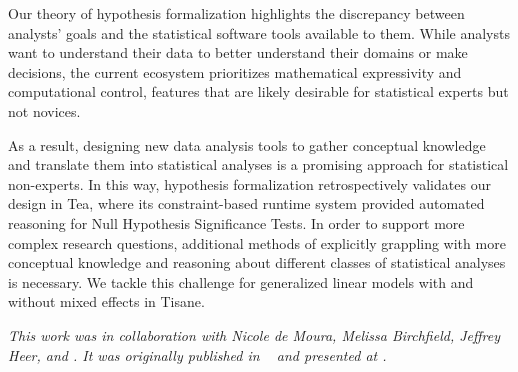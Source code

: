 Our theory of hypothesis formalization highlights the discrepancy between
analysts' goals and the statistical software tools available to them. While
analysts want to understand their data to better understand their domains or
make decisions, the current ecosystem prioritizes mathematical expressivity and
computational control, features that are likely desirable for statistical
experts but not novices. 

As a result, designing new data analysis tools to gather conceptual knowledge
and translate them into statistical analyses is a promising approach for
statistical non-experts. In this way, hypothesis formalization retrospectively
validates our design in Tea, where its constraint-based runtime system provided
automated reasoning for Null Hypothesis Significance Tests. In order to support
more complex research questions, additional methods of explicitly grappling with
more conceptual knowledge and reasoning about different classes of statistical
analyses is necessary. We tackle this challenge for generalized linear models
with and without mixed effects in Tisane. 

\textit{This work was in collaboration with Nicole de Moura, Melissa Birchfield, Jeffrey
Heer, and \reneJust. It was originally published in ~\cite{} and presented
at .}